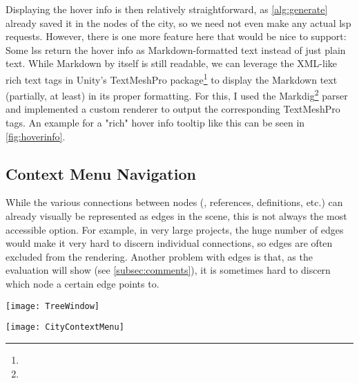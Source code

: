\documentclass[../thesis]{subfiles}
\begin{document}
Displaying the hover info is then relatively straightforward, as \cref{alg:generate} already saved it in the nodes of the city, so we need not even make any actual \gls{lsp} requests.
However, there is one more feature here that would be nice to support:
Some \glspl{ls} return the hover info as Markdown-formatted text instead of just plain text.
While Markdown by itself is still readable, we can leverage the XML-like rich text tags in Unity's TextMeshPro package\footnote{
} to display the Markdown text (partially, at least) in its proper formatting.
For this, I used the Markdig\footnote{} parser and implemented a custom renderer to output the corresponding TextMeshPro tags.
An example for a "rich" hover info tooltip like this can be seen in \cref{fig:hoverinfo}.

\subsection{Context Menu Navigation}
While the various connections between nodes (\ie{}, references, definitions, etc.) can already visually be represented as edges in the scene, this is not always the most accessible option.
For example, in very large projects, the huge number of edges would make it very hard to discern individual connections, so edges are often excluded from the rendering.
Another problem with edges is that, as the evaluation will show (see \cref{subsec:comments}), it is sometimes hard to discern which node a certain edge points to.

\begin{minipage}[t]{.75\textwidth}
	\centering
	\texttt{[image: TreeWindow]}
	\label{fig:treeview}
\end{minipage}%
\begin{minipage}[t]{.25\textwidth}
	\centering
	\texttt{[image: CityContextMenu]}
	\label{fig:contextcity}
\end{minipage}
\end{document}
